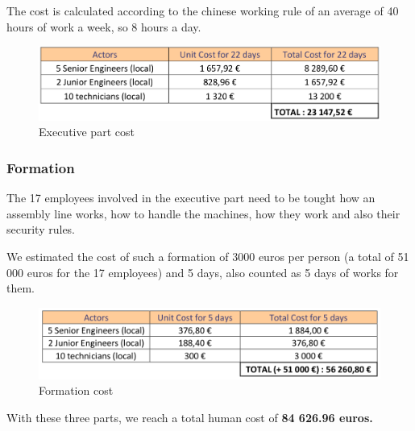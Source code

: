 	The cost is calculated according to the chinese working rule of an average of 40 hours of work a week, so 8 hours a day.

	\begin{figure}[h]

	\centering
	\includegraphics[scale=0.6]{Img/secondPartHumanCost.png}
	\caption{Executive part cost}

	\end{figure}

\subsubsection{Formation}
	The 17 employees involved in the executive part need to be tought how an assembly line works, how to handle the machines, how they work and also their security rules. 

	We estimated the cost of such a formation of 3000 euros per person (a total of 51 000 euros for the 17 employees) and 5 days, also counted as 5 days of works for them.

	\begin{figure}[h]

	\centering
	\includegraphics[scale=0.6]{Img/formationCost.png}
	\caption{Formation cost}

	\end{figure}

With these three parts, we reach a total human cost of \textbf{84 626.96 euros.} \\


